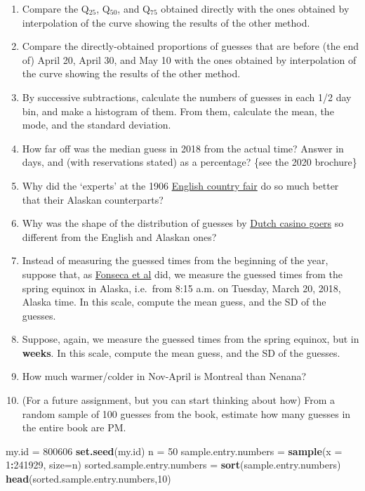 \documentclass[]{book}
\newenvironment{Shaded}{\begin{snugshade}}{\end{snugshade}}
\newcommand{\DataTypeTok}[1]{\textcolor[rgb]{0.13,0.29,0.53}{#1}}
\newcommand{\DecValTok}[1]{\textcolor[rgb]{0.00,0.00,0.81}{#1}}
\newcommand{\KeywordTok}[1]{\textcolor[rgb]{0.13,0.29,0.53}{\textbf{#1}}}
\newcommand{\NormalTok}[1]{#1}
\newcommand{\OperatorTok}[1]{\textcolor[rgb]{0.81,0.36,0.00}{\textbf{#1}}}
\newcommand{\StringTok}[1]{\textcolor[rgb]{0.31,0.60,0.02}{#1}}
\begin{document}
\begin{enumerate}
\def\labelenumi{\arabic{enumi}.}
\setcounter{enumi}{2}
\item
  Compare the Q\(_{25}\), Q\(_{50}\), and Q\(_{75}\) obtained directly with the ones obtained by interpolation of the curve showing the results of the other method.
\item
  Compare the directly-obtained proportions of guesses that are before (the end of) April 20, April 30, and May 10 with the ones obtained by interpolation of the curve showing the results of the other method.
\item
  By successive subtractions, calculate the numbers of guesses in each 1/2 day bin, and make a histogram of them. From them, calculate the mean, the mode, and the standard deviation.
\item
  How far off was the median guess in 2018 from the actual time? Answer in days, and (with reservations stated) as a percentage? \{see the 2020 brochure\}
\item
  Why did the `experts' at the 1906 \href{http://galton.org/essays/1900-1911/galton-1907-vox-populi.pdf}{English country fair} do so much better that their Alaskan counterparts?
\item
  Why was the shape of the distribution of guesses by \href{http://www.medicine.mcgill.ca/epidemiology/hanley/bios691/The_wisdom_of_the_inner_crowd_.pdf}{Dutch casino goers} so different from the English and Alaskan ones?
\item
  Instead of measuring the guessed times from the beginning of the year, suppose that, as \href{http://www.medicine.mcgill.ca/epidemiology/hanley/bios691/VoxPopuliNenana.pdf}{Fonseca et al}
  did, we measure the guessed times from the spring equinox in Alaska, i.e.~from 8:15 a.m. on Tuesday, March 20, 2018, Alaska time. In this scale, compute the mean guess, and the SD of the guesses.
\item
  Suppose, again, we measure the guessed times from the spring equinox, but in \textbf{weeks}. In this scale, compute the mean guess, and the SD of the guesses.
\item
  How much warmer/colder in Nov-April is Montreal than Nenana?
\item
  (For a future assignment, but you can start thinking about how) From a random sample of 100 guesses from the book, estimate how many guesses in the entire book are PM.
\end{enumerate}

\begin{Shaded}
\begin{Highlighting}[]
\NormalTok{my.id =}\StringTok{ }\DecValTok{800606}
\KeywordTok{set.seed}\NormalTok{(my.id)}
\NormalTok{n =}\StringTok{ }\DecValTok{50}
\NormalTok{sample.entry.numbers =}\StringTok{ }\KeywordTok{sample}\NormalTok{(}\DataTypeTok{x =} \DecValTok{1}\OperatorTok{:}\DecValTok{241929}\NormalTok{, }\DataTypeTok{size=}\NormalTok{n)}
\NormalTok{sorted.sample.entry.numbers =}\StringTok{ }\KeywordTok{sort}\NormalTok{(sample.entry.numbers)}
\KeywordTok{head}\NormalTok{(sorted.sample.entry.numbers,}\DecValTok{10}\NormalTok{)}
\end{Highlighting}
\end{Shaded}
\end{document}
